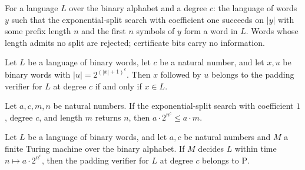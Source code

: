 \begin{definition}
\label{Complexity.a3Verifier}
\leanok
{}
For a language $L$ over the binary alphabet and a degree $c$: the language of
words $y$ such that the exponential-split search with coefficient one succeeds
on $|y|$ with some prefix length $n$ and the first $n$ symbols of $y$ form a
word in $L$. Words whose length admits no split are rejected; certificate bits
carry no information.
\end{definition}

\begin{lemma}
\label{Complexity.a3_verifier_append}
\leanok
{}
Let $L$ be a language of binary words, let $c$ be a natural number, and let $x,u$ be
binary words with $|u|=2^{(|x|+1)^c}$. Then $x$ followed by $u$ belongs to the padding
verifier for $L$ at degree $c$ if and only if $x\in L$.
\end{lemma}

\begin{lemma}
\label{Complexity.a3_source_budget}
\leanok
{}
Let $a,c,m,n$ be natural numbers. If the exponential-split search with coefficient $1$,
degree $c$, and length $m$ returns $n$, then $a\cdot 2^{n^c}\le a\cdot m$.
\end{lemma}

\begin{lemma}
\label{Complexity.a3_verifier_mem_P}
\leanok
{}
Let $L$ be a language of binary words, and let $a,c$ be natural numbers and $M$ a finite
Turing machine over the binary alphabet. If $M$ decides $L$ within time $n\mapsto a\cdot
2^{n^c}$, then the padding verifier for $L$ at degree $c$ belongs to $\mathrm{P}$.
\end{lemma}

